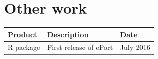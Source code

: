 \documentclass[11pt,a4paper,oldfontcommands,openany]{memoir}
\numberwithin{equation}{section} %
\begin{document}
\section{Other work}

\begin{tabular}{|p{3cm}|p{8cm}|p{3cm}|}
 \hline
 \textbf{Product} & \textbf{Description} & \textbf{Date} \\ 
 \hline
 R package & First release of ePort & July 2016 \\
 \hline
\end{tabular}


\end{document}
